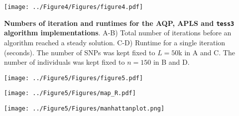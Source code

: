 \clearpage 
\newpage

\begin{center}
\texttt{[image: ../Figure4/Figures/figure4.pdf]}
\end{center}
 {\bf Numbers of iteration and runtimes for the AQP, APLS and {\tt tess3} algorithm implementations}. A-B)   Total number of iterations before an algorithm reached a steady solution. C-D) Runtime for a single iteration (seconds). The number of SNPs was kept fixed to $L = 50$k in A and C. The number of individuals was kept fixed to $n = 150$ in B and D. 


\clearpage 
\newpage

\begin{center}
\texttt{[image: ../Figure5/Figures/figure5.pdf]}
\end{center}

\clearpage 
\newpage

\begin{center}
\texttt{[image: ../Figure5/Figures/map\_R.pdf]}
\end{center}

\clearpage 
\newpage

\begin{center}
\texttt{[image: ../Figure5/Figures/manhattanplot.png]}
\end{center}



